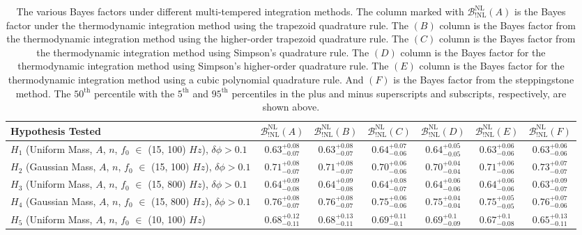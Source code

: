 \begin{table}[ht]
\begin{tabularx}{1.0\textwidth}{l c c c c c c}
\hline\hline
 Hypothesis Tested  & $\mathcal{B}^{\mathrm{NL}}_{\mathrm{!NL}}(A)$  & $\mathcal{B}^{\mathrm{NL}}_{\mathrm{!NL}}(B)$ & $\mathcal{B}^{\mathrm{NL}}_{\mathrm{!NL}}(C)$ & $\mathcal{B}^{\mathrm{NL}}_{\mathrm{!NL}}(D)$ & $\mathcal{B}^{\mathrm{NL}}_{\mathrm{!NL}}(E)$ & $\mathcal{B}^{\mathrm{NL}}_{\mathrm{!NL}}(F)$\\
\hline\hline
$H_1$ (Uniform Mass, $A$, $n$, $f_0$ $\in$ (15, 100) $Hz$), $\delta \phi > 0.1$ &
$0.63^{+0.08}_{-0.07}$ & $0.63^{+0.08}_{-0.07}$ & $0.64^{+0.07}_{-0.06}$ & $0.64^{+0.05}_{-0.05}$ & $0.63^{+0.06}_{-0.06}$ & $0.63^{+0.06}_{-0.06}$ \\ 
\hline 
$H_2$ (Gaussian Mass, $A$, $n$, $f_0$ $\in$ (15, 100) $Hz$), $\delta \phi > 0.1$ &
$0.71^{+0.08}_{-0.07}$ & $0.71^{+0.08}_{-0.07}$ & $0.70^{+0.06}_{-0.06}$ & $0.70^{+0.04}_{-0.04}$ & $0.71^{+0.06}_{-0.06}$ & $0.73^{+0.07}_{-0.07}$ \\ 
\hline
$H_3$ (Uniform Mass, $A$, $n$, $f_0$ $\in$ (15, 800) $Hz$), $\delta \phi > 0.1$ &
$0.64^{+0.09}_{-0.08}$ & $0.64^{+0.09}_{-0.08}$ & $0.64^{+0.08}_{-0.07}$ & $0.64^{+0.06}_{-0.06}$ & $0.64^{+0.06}_{-0.06}$ & $0.63^{+0.09}_{-0.07}$ \\  
\hline
$H_4$ (Gaussian Mass, $A$, $n$, $f_0$ $\in$ (15, 800) $Hz$), $\delta \phi > 0.1$ &
$0.76^{+0.08}_{-0.07}$ & $0.76^{+0.08}_{-0.07}$ & $0.75^{+0.06}_{-0.06}$ & $0.75^{+0.04}_{-0.04}$ & $0.75^{+0.05}_{-0.05}$ & $0.76^{+0.07}_{-0.06}$ \\ 
\hline
$H_5$ (Uniform Mass, $A$, $n$, $f_0$ $\in$ (10, 100) $Hz$) &
$0.68^{+0.12}_{-0.11}$ & $0.68^{+0.13}_{-0.11}$ & $0.69^{+0.11}_{-0.1}$ & $0.69^{+0.1}_{-0.09}$ & $0.67^{+0.1}_{-0.08}$ & $0.65^{+0.13}_{-0.11}$ \\ 
\hline\hline
\end{tabularx}
\caption{The various Bayes factors under different multi-tempered integration methods. The column marked with $\mathcal{B}^{\mathrm{NL}}_{\mathrm{!NL}}(A)$ is the Bayes factor under the thermodynamic integration method using the trapezoid quadrature rule. The $(B)$ column is the Bayes factor from the thermodynamic integration method using the higher-order trapezoid quadrature rule. The $(C)$ column is the Bayes factor from the thermodynamic integration method using Simpson's quadrature rule. The $(D)$ column is the Bayes factor for the thermodynamic integration method using Simpson's higher-order quadrature rule. The $(E)$ column is the Bayes factor for the thermodynamic integration method using a cubic polynomial quadrature rule. And $(F)$ is the Bayes factor from the steppingstone method. The $50^{\mathrm{th}}$ percentile with the $5^{\mathrm{th}}$ and $95^{\mathrm{th}}$ percentiles in the plus and minus superscripts and subscripts, respectively, are shown above.}\label{table:Bayes}
\end{table}

